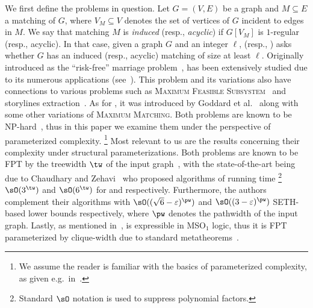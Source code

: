 We first define the problems in question.
Let $G=(V,E)$ be a graph and $M \subseteq E$ a matching of $G$, where $V_M \subseteq V$ denotes
the set of vertices of $G$ incident to edges in $M$.
We say that matching $M$ is \emph{induced} (resp., \emph{acyclic}) if $G[V_M]$ is $1$-regular (resp., acyclic).
In that case, given a graph $G$ and an integer $\ell$,
{\InducedM} (resp., \AcyclicM) asks whether $G$ has an induced (resp., acyclic) matching of size at least $\ell$.
Originally introduced as the ``risk-free'' marriage problem~\cite{ipl/StockmeyerV82},
{\InducedM} has been extensively studied due to its numerous applications (see~\cite{dam/GolumbicL00}).
This problem and its variations also have connections to various problems such as
\textsc{Maximum Feasible Subsystem}~\cite{soda/ChalermsookLN13,soda/ElbassioniRRS09}
and storylines extraction~\cite{kdd/KumarMS04}.
As for \AcyclicM, it was introduced by Goddard et al.~\cite{dm/GoddardHHL05}
along with some other variations of \textsc{Maximum Matching}.
Both problems are known to be NP-hard~\cite{dam/Cameron89,dm/GoddardHHL05,ipl/StockmeyerV82},
thus in this paper we examine them under the perspective of parameterized complexity.%
\footnote{We assume the reader is familiar with the basics of parameterized complexity,
as given e.g.~in~\cite{books/CyganFKLMPPS15}.}
Most relevant to us are the results concerning their complexity under structural parameterizations.
Both problems are known to be FPT by the treewidth $\tw$ of the input graph~\cite{wg/ChaudharyZ23a,tcs/HajebiJ23,dam/MoserS09},
with the state-of-the-art being due to Chaudhary and Zehavi~\cite{wg/ChaudharyZ23a}
who proposed algorithms of running time%
\footnote{Standard $\sO$ notation is used to suppress polynomial factors.}
$\sO(3^{\tw})$ and $\sO(6^{\tw})$ for {\InducedM} and {\AcyclicM} respectively.
Furthermore, the authors complement their algorithms with
$\sO((\sqrt{6}-\varepsilon)^{\pw})$ and $\sO((3-\varepsilon)^{\pw})$ SETH-based lower bounds respectively,
where $\pw$ denotes the pathwidth of the input graph.
Lastly, as mentioned in~\cite{algorithmica/KoblerR03}, {\InducedM} is expressible in MSO$_1$ logic,
thus it is FPT parameterized by clique-width due to standard metatheorems~\cite{mst/CourcelleMR00}.


